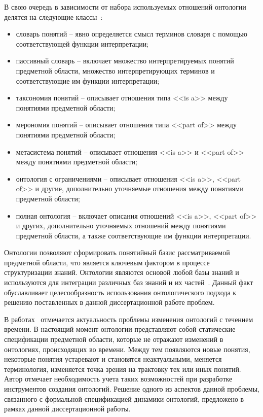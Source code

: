 В свою очередь в зависимости от набора используемых отношений онтологии делятся на следующие классы~\cite{Gavrilova2001}: 
\begin{itemize}
  \item словарь понятий – явно определяется смысл терминов словаря с помощью соответствующей функции интерпретации;
  \item пассивный словарь – включает множество интерпретируемых понятий предметной области, множество интерпретирующих терминов и соответствующие им функции интерпретации;
  \item таксономия понятий – описывает отношения типа <<is a>> между понятиями предметной области;
  \item мерономия понятий – описывает отношения типа <<part of>> между понятиями предметной области;
  \item метасистема понятий – описывает отношения <<is a>> и <<part of>> между понятиями предметной области; 
  \item онтология с ограничениями – описывает отношения <<is a>>, <<part of>> и другие, дополнительно уточняемые отношения между понятиями предметной области;
  \item полная онтология – включает описания отношений <<is a>>, <<part of>> и других, дополнительно уточняемых отношений между понятиями предметной области, а также соответствующие им функции интерпретации.
\end{itemize}

Онтологии позволяют сформировать понятийный базис рассматриваемой предметной области, что является ключевым фактором в процессе структуризации знаний. Онтологии являются основой любой базы знаний и используются для интеграции различных баз знаний и их частей~\cite{Gavrilova2016}. Данный факт обуславливает целесообразность использования онтологического подхода к решению поставленных в данной диссертационной работе проблем.

В работах~\cite{Lapshin2010, Hazman2011} отмечается актуальность проблемы изменения онтологий с течением времени. В настоящий момент онтологии представляют собой статические спецификации предметной области, которые не отражают изменений в онтологиях, происходящих во времени. Между тем появляются новые понятия, некоторые понятия устаревают и становятся неактуальными, меняется терминология, изменяется точка зрения на трактовку тех или иных понятий. Автор отмечает необходимость учета таких возможностей при разработке инструментов создания онтологий. Решение одного из аспектов данной проблемы, связанного с формальной спецификацией динамики онтологий, предложено в рамках данной диссертационной работы.

